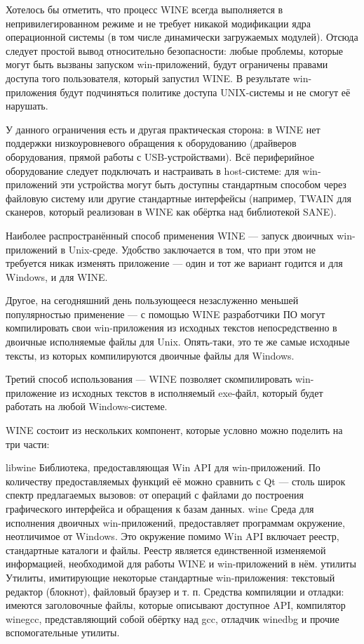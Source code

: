 Хотелось бы отметить, что процесс WINE всегда выполняется в непривилегированном режиме и не требует никакой модификации ядра операционной системы (в том числе динамически загружаемых модулей). Отсюда следует простой вывод относительно безопасности: любые проблемы, которые могут быть вызваны запуском win-приложений, будут ограничены правами доступа того пользователя, который запустил WINE. В результате win-приложения будут подчиняться политике доступа UNIX-системы и не смогут её нарушать.

У данного ограничения есть и другая практическая сторона: в WINE нет поддержки низкоуровневого обращения к оборудованию (драйверов оборудования, прямой работы с USB-устройствами). Всё периферийное оборудование следует подключать и настраивать в host-системе: для win-приложений эти устройства могут быть доступны стандартным способом через файловую систему или другие стандартные интерфейсы (например, TWAIN для сканеров, который реализован в WINE как обёртка над библиотекой SANE).

Наиболее распространённый способ применения WINE — запуск двоичных win-приложений в Unix-среде. Удобство заключается в том, что при этом не требуется никак изменять приложение — один и тот же вариант годится и для Windows, и для WINE.

Другое, на сегодняшний день пользующееся незаслуженно меньшей популярностью применение — с помощью WINE разработчики ПО могут компилировать свои win-приложения из исходных текстов непосредственно в двоичные исполняемые файлы для Unix. Опять-таки, это те же самые исходные тексты, из которых компилируются двоичные файлы для Windows.

Третий способ использования — WINE позволяет скомпилировать win-приложение из исходных текстов в исполняемый exe-файл, который будет работать на любой Windows-системе.

WINE состоит из нескольких компонент, которые условно можно поделить на три части:

libwine
Библиотека, предоставляющая Win API для win-приложений. По количеству предоставляемых функций её можно сравнить с Qt — столь широк спектр предлагаемых вызовов: от операций с файлами до построения графического интерфейса и обращения к базам данных.
wine
Среда для исполнения двоичных win-приложений, предоставляет программам окружение, неотличимое от Windows. Это окружение помимо Win API включает реестр, стандартные каталоги и файлы. Реестр является единственной изменяемой информацией, необходимой для работы WINE и win-приложений в нём.
утилиты
Утилиты, имитирующие некоторые стандартные win-приложения: текстовый редактор (блокнот), файловый браузер и т. п. Средства компиляции и отладки: имеются заголовочные файлы, которые описывают доступное API, компилятор winegcc, представляющий собой обёртку над gcc, отладчик winedbg и прочие вспомогательные утилиты.

